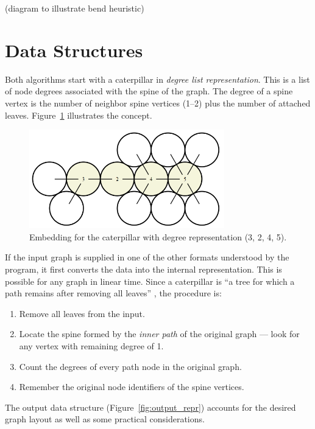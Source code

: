 \documentclass[draft,final]{vutinfth} %
\begin{document}
(diagram to illustrate bend heuristic)

\section{Data Structures}

Both algorithms start with a caterpillar in \emph{degree list representation}.
This is a list of node degrees associated with the spine of the graph.
The degree of a spine vertex is the number of neighbor spine vertices (1--2) plus the number of attached leaves. Figure~\ref{fig:degree_repr} illustrates the concept.

\begin{figure}
    \centering
    \includegraphics[width=240pt]{graphics/degree_repr.png}
    \caption{Embedding for the caterpillar with degree representation (3, 2, 4, 5).}
    \label{fig:degree_repr}
\end{figure}

If the input graph is supplied in one of the other formats understood by the program, it first converts the data into the internal representation. This is possible for any graph in linear time.
Since a caterpillar is ``a tree for which a path remains after removing all leaves'' \cite{Klemz2015}, the procedure is:

\begin{enumerate}
    \item Remove all leaves from the input.
    \item Locate the spine formed by the \emph{inner path} of the original graph --- look for any vertex with remaining degree of 1.
    \item Count the degrees of every path node in the original graph.
    \item Remember the original node identifiers of the spine vertices.
\end{enumerate}

The output data structure (Figure~\ref{fig:output_repr}) accounts for the desired graph layout as well as some practical considerations.
\end{document}

